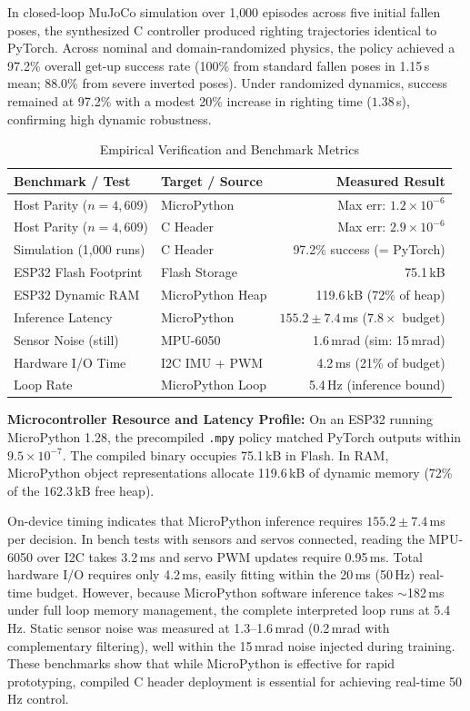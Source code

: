 \documentclass[10pt, conference, a4paper]{IEEEtran}
\begin{document}
In closed-loop MuJoCo simulation over 1{,}000 episodes across five initial fallen poses, the synthesized C controller produced righting trajectories identical to PyTorch. Across nominal and domain-randomized physics, the policy achieved a 97.2\% overall get-up success rate (100\% from standard fallen poses in 1.15\,s mean; 88.0\% from severe inverted poses). Under randomized dynamics, success remained at 97.2\% with a modest 20\% increase in righting time ($1.38$\,s), confirming high dynamic robustness.

\begin{table}[htbp]
\centering
\caption{Empirical Verification and Benchmark Metrics}
\label{tab:verify}
\scriptsize
\setlength{\tabcolsep}{2.5pt}
\begin{tabular}{llr}
\toprule
\textbf{Benchmark / Test} & \textbf{Target / Source} & \textbf{Measured Result} \\
\midrule
Host Parity ($n{=}4{,}609$) & MicroPython & Max err: $1.2{\times}10^{-6}$ \\
Host Parity ($n{=}4{,}609$) & C Header & Max err: $2.9{\times}10^{-6}$ \\
Simulation (1{,}000 runs) & C Header & 97.2\% success (= PyTorch) \\
ESP32 Flash Footprint & Flash Storage & 75.1\,kB \\
ESP32 Dynamic RAM & MicroPython Heap & 119.6\,kB (72\% of heap) \\
Inference Latency & MicroPython & $155.2 \pm 7.4$\,ms ($7.8\times$ budget) \\
Sensor Noise (still) & MPU-6050 & 1.6\,mrad (sim: 15\,mrad) \\
Hardware I/O Time & I2C IMU + PWM & 4.2\,ms (21\% of budget) \\
Loop Rate & MicroPython Loop & 5.4\,Hz (inference bound) \\
\bottomrule
\end{tabular}
\end{table}

\textbf{Microcontroller Resource and Latency Profile:}
On an ESP32 running MicroPython 1.28, the precompiled \texttt{.mpy} policy matched PyTorch outputs within $9.5\times10^{-7}$. The compiled binary occupies 75.1\,kB in Flash. In RAM, MicroPython object representations allocate 119.6\,kB of dynamic memory (72\% of the 162.3\,kB free heap). 

On-device timing indicates that MicroPython inference requires $155.2 \pm 7.4$\,ms per decision. In bench tests with sensors and servos connected, reading the MPU-6050 over I2C takes 3.2\,ms and servo PWM updates require 0.95\,ms. Total hardware I/O requires only 4.2\,ms, easily fitting within the 20\,ms (50\,Hz) real-time budget. However, because MicroPython software inference takes $\sim$182\,ms under full loop memory management, the complete interpreted loop runs at 5.4\,Hz. Static sensor noise was measured at 1.3--1.6\,mrad (0.2\,mrad with complementary filtering), well within the 15\,mrad noise injected during training. These benchmarks show that while MicroPython is effective for rapid prototyping, compiled C header deployment is essential for achieving real-time 50\,Hz control.
\end{document}
